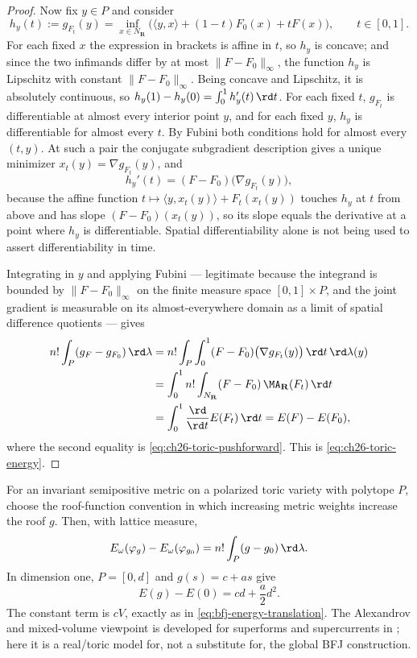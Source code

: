 \begin{proof}
Now fix $y\in P$ and consider
\[
 h_y(t):=g_{F_t}(y)
 =\inf_{x\in N_{\mathbf R}}
   \bigl(\langle y,x\rangle+(1-t)F_0(x)+tF(x)\bigr),
 \qquad t\in[0,1].
\]
For each fixed $x$ the expression in brackets is affine in $t$, so
$h_y$ is concave; and since the two infimands differ by at most
$\lVert F-F_0\rVert_\infty$, the function $h_y$ is Lipschitz with
constant $\lVert F-F_0\rVert_\infty$.  Being concave and Lipschitz, it is
absolutely continuous, so $h_y(1)-h_y(0)=\int_0^1h_y'(t)\,\rd t$.  For each fixed $t$, $g_{F_t}$ is differentiable at almost every interior
point $y$, and for each fixed $y$, $h_y$ is differentiable for almost every
$t$.  By Fubini both conditions hold for almost every $(t,y)$.
At such a pair the conjugate subgradient description gives a unique
minimizer $x_t(y)=\nabla g_{F_t}(y)$, and
\[
 h_y'(t)=(F-F_0)\bigl(\nabla g_{F_t}(y)\bigr),
\]
because the affine function $t\mapsto\langle y,x_t(y)\rangle+F_t(x_t(y))$
touches $h_y$ at $t$ from above and has slope
$(F-F_0)(x_t(y))$, so its slope equals the derivative at a point where $h_y$ is
differentiable.  Spatial differentiability alone is not being used to
assert differentiability in time.

Integrating in $y$ and applying Fubini --- legitimate because the
integrand is bounded by $\lVert F-F_0\rVert_\infty$ on the finite measure
space $[0,1]\times P$, and the joint gradient is measurable on its
almost-everywhere domain as a limit of spatial difference quotients --- gives
\[
\begin{split}
 n!\int_P(g_F-g_{F_0})\,\rd\lambda
 &=n!\int_P\int_0^1(F-F_0)
     \bigl(\nabla g_{F_t}(y)\bigr)\,\rd t\,\rd\lambda(y)\\
 &=\int_0^1n!\int_{N_{\mathbf R}}(F-F_0)\,
     \MA_{\mathbf R}(F_t)\,\rd t\\
 &=\int_0^1\frac{\rd}{\rd t}E(F_t)\,\rd t
  =E(F)-E(F_0),
\end{split}
\]
where the second equality is \eqref{eq:ch26-toric-pushforward}.  This is
\eqref{eq:ch26-toric-energy}.
\end{proof}

\begin{example}
\label{ex:ch26-toric-roof-functions}
For an invariant semipositive metric on a polarized toric variety with
polytope $P$, choose the roof-function convention in which increasing
metric weights increase the roof $g$. Then, with lattice measure,
\[
              E_\omega(\varphi_g)-E_\omega(\varphi_{g_0})
              =n!\int_P(g-g_0)\,\rd \lambda.
\]
In dimension one, $P=[0,d]$ and $g(s)=c+as$ give
\[
              E(g)-E(0)=cd+\frac a2d^2.
\]
The constant term is $cV$, exactly as in
\eqref{eq:bfj-energy-translation}. The Alexandrov and mixed-volume viewpoint is
developed for superforms and supercurrents in \cite{Ber26Convex}; here it is
a real/toric model for, not a substitute for, the global BFJ construction.
\end{example}

